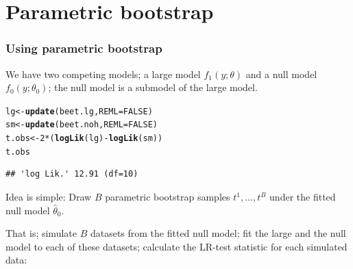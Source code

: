 \documentclass[compress]{beamer}\usepackage[]{graphicx}\usepackage[]{color}
\makeatletter
\newcommand{\hlnum}[1]{\textcolor[rgb]{0.686,0.059,0.569}{#1}}%
\newcommand{\hlopt}[1]{\textcolor[rgb]{0,0,0}{#1}}%
\newcommand{\hlstd}[1]{\textcolor[rgb]{0.345,0.345,0.345}{#1}}%
\newcommand{\hlkwb}[1]{\textcolor[rgb]{0.69,0.353,0.396}{#1}}%
\newcommand{\hlkwc}[1]{\textcolor[rgb]{0.333,0.667,0.333}{#1}}%
\newcommand{\hlkwd}[1]{\textcolor[rgb]{0.737,0.353,0.396}{\textbf{#1}}}%
\newenvironment{kframe}{%
 \def\at@end@of@kframe{}%
 \ifinner\ifhmode%
  \def\at@end@of@kframe{\end{minipage}}%
  \begin{minipage}{\columnwidth}%
 \fi\fi%
 \def\FrameCommand##1{\hskip\@totalleftmargin \hskip-\fboxsep
 \colorbox{shadecolor}{##1}\hskip-\fboxsep
     \hskip-\linewidth \hskip-\@totalleftmargin \hskip\columnwidth}%
 \MakeFramed {\advance\hsize-\width
   \@totalleftmargin\z@ \linewidth\hsize
   \@setminipage}}%
 {\par\unskip\endMakeFramed%
 \at@end@of@kframe}
\newenvironment{knitrout}{}{} %
\newenvironment{sframe}
{\begin{frame} [containsverbatim] }
  {\end{frame}}
\makeatother
\begin{document}
\section{Parametric bootstrap}
\label{sec:parametric-bootstrap}
\begin{sframe}
\frametitle{Using parametric bootstrap}

We have two competing models; a large model $f_1(y; \theta)$
and a null model $f_0(y; \theta_0)$; the null model is a submodel of the large model. 

\begin{knitrout}\scriptsize
{}\color{fgcolor}\begin{kframe}
\begin{alltt}
\hlstd{lg} \hlkwb{<-} \hlkwd{update}\hlstd{(beet.lg,} \hlkwc{REML}\hlstd{=}\hlnum{FALSE}\hlstd{)}
\hlstd{sm} \hlkwb{<-} \hlkwd{update}\hlstd{(beet.noh,} \hlkwc{REML}\hlstd{=}\hlnum{FALSE}\hlstd{)}
\hlstd{t.obs} \hlkwb{<-} \hlnum{2}\hlopt{*}\hlstd{(}\hlkwd{logLik}\hlstd{(lg)}\hlopt{-}\hlkwd{logLik}\hlstd{(sm))}
\hlstd{t.obs}
\end{alltt}
\begin{verbatim}
## 'log Lik.' 12.91 (df=10)
\end{verbatim}
\end{kframe}
\end{knitrout}

Idea is simple: Draw $B$ parametric bootstrap samples
$t^1, \dots, t^B$ under the fitted null model $\hat \theta_0$. 

That is; simulate $B$
datasets from the fitted null model; fit the large and the null model to each of
these datasets; calculate the LR-test statistic for each simulated data:
\end{sframe}
\end{document}
